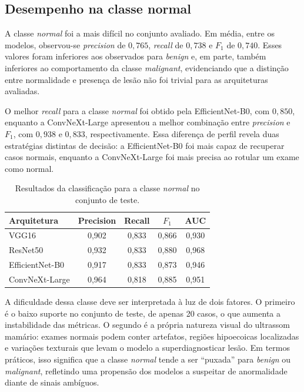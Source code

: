 \documentclass[tcc,capa]{texufpel}
\begin{document}
\subsection{Desempenho na classe normal}

A classe \textit{normal} foi a mais difícil no conjunto avaliado. Em média, entre os modelos, observou-se \textit{precision} de \(0{,}765\), \textit{recall} de \(0{,}738\) e \(F_1\) de \(0{,}740\). Esses valores foram inferiores aos observados para \textit{benign} e, em parte, também inferiores ao comportamento da classe \textit{malignant}, evidenciando que a distinção entre normalidade e presença de lesão não foi trivial para as arquiteturas avaliadas.

O melhor \textit{recall} para a classe \textit{normal} foi obtido pela EfficientNet-B0, com \(0{,}850\), enquanto a ConvNeXt-Large apresentou a melhor combinação entre \textit{precision} e \(F_1\), com \(0{,}938\) e \(0{,}833\), respectivamente. Essa diferença de perfil revela duas estratégias distintas de decisão: a EfficientNet-B0 foi mais capaz de recuperar casos normais, enquanto a ConvNeXt-Large foi mais precisa ao rotular um exame como normal.

\begin{table}[h]
	\centering
	\caption{Resultados da classificação para a classe \textit{normal} no conjunto de teste.}
	\label{tab:resultados_normal}
	\begin{tabular}{lcccc}
		\hline
		\textbf{Arquitetura} & \textbf{Precision} & \textbf{Recall} & \textbf{\(F_1\)} & \textbf{AUC} \\
		\hline
		VGG16            & 0{,}902 & 0{,}833 & 0{,}866 & 0{,}930 \\
		ResNet50         & 0{,}932 & 0{,}833 & 0{,}880 & 0{,}968 \\
		EfficientNet-B0  & 0{,}917 & 0{,}833 & 0{,}873 & 0{,}946 \\
		ConvNeXt-Large   & 0{,}964 & 0{,}818 & 0{,}885 & 0{,}951 \\
		\hline
	\end{tabular}
\end{table}

A dificuldade dessa classe deve ser interpretada à luz de dois fatores. O primeiro é o baixo suporte no conjunto de teste, de apenas 20 casos, o que aumenta a instabilidade das métricas. O segundo é a própria natureza visual do ultrassom mamário: exames normais podem conter artefatos, regiões hipoecoicas localizadas e variações texturais que levam o modelo a superdiagnosticar lesão. Em termos práticos, isso significa que a classe \textit{normal} tende a ser “puxada” para \textit{benign} ou \textit{malignant}, refletindo uma propensão dos modelos a suspeitar de anormalidade diante de sinais ambíguos.
\end{document}
